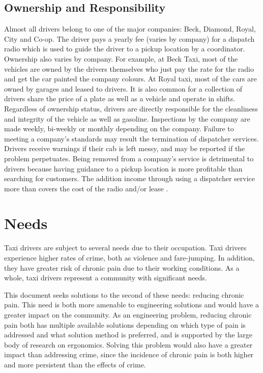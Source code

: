 \documentclass[11pt]{article}
\begin{document}
\subsection{Ownership and Responsibility}

Almost all drivers belong to one of the major companies: Beck, Diamond, Royal, City and
Co-op. The driver pays a yearly fee (varies by company) for a dispatch radio which is used to guide the 
driver to a pickup location by a coordinator. Ownership also varies by company. For example, 
at Beck Taxi, most of the vehicles are owned by the drivers themselves who just pay the 
rate for the radio and get the car painted the company colours. At Royal taxi, most of the 
cars are owned by garages and leased to drivers. It is also common for a collection of 
drivers share the price of a plate as well as a vehicle and operate in shifts. Regardless of   
ownership status, drivers are directly responsible for the cleanliness and integrity of the vehicle as well as gasoline. 
Inspections by the company are made weekly, bi-weekly or monthly depending on the company. 
Failure to meeting a company's standards may result the termination of dispatcher services. Drivers receive 
warnings if their cab is left messy, and may be reported if the problem perpetuates. Being removed from
a company's service is detrimental to drivers because having guidance to a pickup location
is more profitable than searching for customers. The addition income through using a dispatcher 
service more than covers the cost of the radio and/or lease \cite{thestar2012, Gowder2013}.
\section{Needs}
\label{sec:needs}
Taxi drivers are subject to several needs due to their
occupation. Taxi drivers experience higher rates of crime, both as
violence and fare-jumping\cite{policeverywherejustnowhere}. In
addition, they have greater risk of chronic pain due to their working
conditions\cite{ODrivers@Risk,KneePain,POSTULATED}. As a whole, taxi
drivers represent a community with significant needs. 

This document seeks solutions to the second of these needs: reducing
chronic pain. This need is both more amenable to engineering solutions
and would have a greater impact on the community. As an engineering
problem, reducing chronic pain both has multiple available solutions
depending on which type of pain is addressed and what solution method
is preferred, and is supported by the large body of research on
ergonomics. Solving this problem would also have a greater impact than
addressing crime, since the incidence of chronic pain is both higher
and more persistent than the effects of crime.
\end{document}
